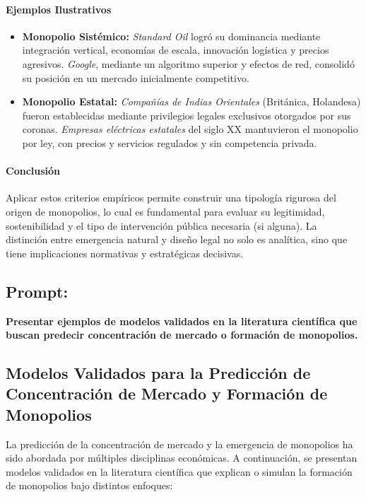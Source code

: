 \documentclass[a4paper,12pt]{article}
\begin{document}
\paragraph{Ejemplos Ilustrativos}

\begin{itemize}
    \item \textbf{Monopolio Sistémico:} \textit{Standard Oil} logró su dominancia mediante integración vertical, economías de escala, innovación logística y precios agresivos. \textit{Google}, mediante un algoritmo superior y efectos de red, consolidó su posición en un mercado inicialmente competitivo.

    \item \textbf{Monopolio Estatal:} \textit{Compañías de Indias Orientales} (Británica, Holandesa) fueron establecidas mediante privilegios legales exclusivos otorgados por sus coronas. \textit{Empresas eléctricas estatales} del siglo XX mantuvieron el monopolio por ley, con precios y servicios regulados y sin competencia privada.
\end{itemize}

\paragraph{Conclusión}

Aplicar estos criterios empíricos permite construir una tipología rigurosa del origen de monopolios, lo cual es fundamental para evaluar su legitimidad, sostenibilidad y el tipo de intervención pública necesaria (si alguna). La distinción entre emergencia natural y diseño legal no solo es analítica, sino que tiene implicaciones normativas y estratégicas decisivas.


\subsection*{Prompt:}
\textbf{Presentar ejemplos de modelos validados en la literatura científica que buscan predecir concentración de mercado o formación de monopolios.}

\subsection*{Modelos Validados para la Predicción de Concentración de Mercado y Formación de Monopolios}

La predicción de la concentración de mercado y la emergencia de monopolios ha sido abordada por múltiples disciplinas económicas. A continuación, se presentan modelos validados en la literatura científica que explican o simulan la formación de monopolios bajo distintos enfoques:
\end{document}
